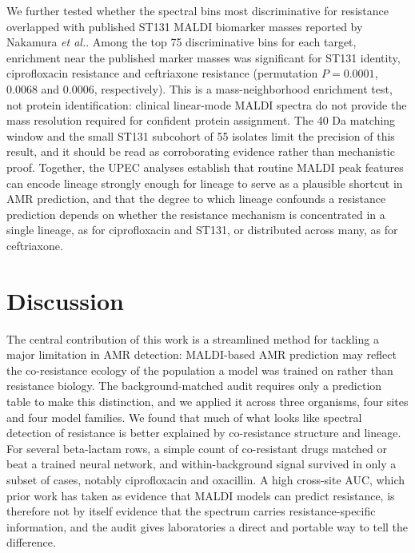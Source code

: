 \documentclass[11pt]{article}
\begin{document}




We further tested whether the spectral bins most discriminative for resistance overlapped with published ST131 MALDI biomarker masses reported by Nakamura \textit{et al.}\cite{nakamura2019st131}. Among the top 75 discriminative bins for each target, enrichment near the published marker masses was significant for ST131 identity, ciprofloxacin resistance and ceftriaxone resistance (permutation $P = 0.0001$, 0.0068 and 0.0006, respectively). This is a mass-neighborhood enrichment test, not protein identification: clinical linear-mode MALDI spectra do not provide the mass resolution required for confident protein assignment. The 40 Da matching window and the small ST131 subcohort of 55 isolates limit the precision of this result, and it should be read as corroborating evidence rather than mechanistic proof. Together, the UPEC analyses establish that routine MALDI peak features can encode lineage strongly enough for lineage to serve as a plausible shortcut in AMR prediction, and that the degree to which lineage confounds a resistance prediction depends on whether the resistance mechanism is concentrated in a single lineage, as for ciprofloxacin and ST131, or distributed across many, as for ceftriaxone.

\section*{Discussion}

The central contribution of this work is a streamlined method for tackling a major limitation in AMR detection: MALDI-based AMR prediction may reflect the co-resistance ecology of the population a model was trained on rather than resistance biology. The background-matched audit requires only a prediction table to make this distinction, and we applied it across three organisms, four sites and four model families. We found that much of what looks like spectral detection of resistance is better explained by co-resistance structure and lineage. For several beta-lactam rows, a simple count of co-resistant drugs matched or beat a trained neural network, and within-background signal survived in only a subset of cases, notably ciprofloxacin and oxacillin. A high cross-site AUC, which prior work has taken as evidence that MALDI models can predict resistance, is therefore not by itself evidence that the spectrum carries resistance-specific information, and the audit gives laboratories a direct and portable way to tell the difference.
\end{document}
